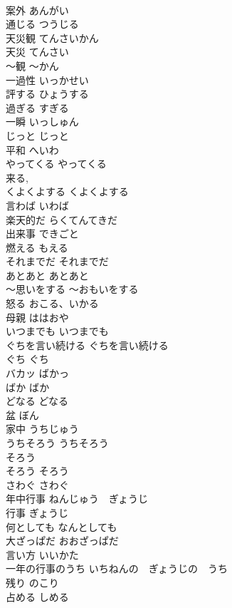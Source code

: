 \documentclass[8pt]{extreport}
\begin{document}
\begin{CJK}{UTF8}{min}
\\	案外	あんがい	
\\	通じる	つうじる	
\\	天災観	てんさいかん	
\\	天災	てんさい	
\\	〜観	〜かん	
\\	一過性	いっかせい	
\\	評する	ひょうする	
\\	過ぎる	すぎる	
\\	一瞬	いっしゅん	
\\	じっと	じっと	
\\	平和	へいわ	
\\	やってくる	やってくる	
\\	来る, 
\\	くよくよする	くよくよする	
\\	言わば	いわば	
\\	楽天的だ	らくてんてきだ	
\\	出来事	できごと	
\\	燃える	もえる	
\\	それまでだ	それまでだ	
\\	あとあと	あとあと	
\\	〜思いをする	〜おもいをする	
\\	怒る	おこる、いかる	
\\	母親	ははおや	
\\	いつまでも	いつまでも	
\\	ぐちを言い続ける	ぐちを言い続ける	
\\	ぐち	ぐち	
\\	バカッ	ばかっ	
\\	ばか	ばか	
\\	どなる	どなる	
\\	盆	ぼん	
\\	家中	うちじゅう	
\\	うちそろう	うちそろう	
\\	そろう
\\	そろう	そろう	
\\	さわぐ	さわぐ	
\\	年中行事	ねんじゅう　ぎょうじ	
\\	行事	ぎょうじ	
\\	何としても	なんとしても	
\\	大ざっぱだ	おおざっぱだ	
\\	言い方	いいかた	
\\	一年の行事のうち	いちねんの　ぎょうじの　うち	
\\	残り	のこり	
\\	占める	しめる	

\end{CJK}
\end{document}
